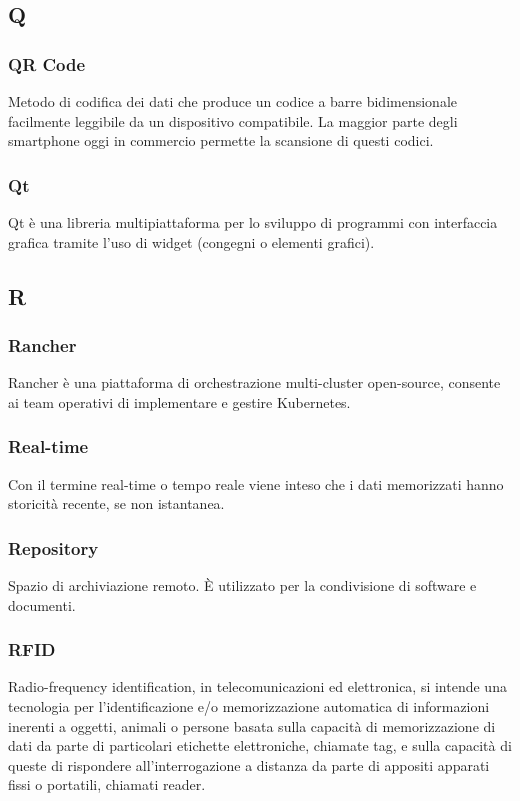 \subsection*{Q}
\subsubsection*{QR Code} Metodo di codifica dei dati che produce un codice a barre bidimensionale facilmente leggibile da un dispositivo compatibile. La maggior parte degli smartphone oggi in commercio permette la scansione di questi codici.
\subsubsection*{Qt} Qt è una libreria multipiattaforma per lo sviluppo di programmi con interfaccia grafica tramite l'uso di widget (congegni o elementi grafici).
\subsection*{R}
\subsubsection*{Rancher} Rancher è una piattaforma di orchestrazione multi-cluster open-source, consente ai team operativi di implementare e gestire Kubernetes.
\subsubsection*{Real-time} Con il termine real-time o tempo reale viene inteso che i dati memorizzati hanno storicità recente, se non istantanea.
\subsubsection*{Repository} Spazio di archiviazione remoto. È utilizzato per la condivisione di software e documenti.
\subsubsection*{RFID} Radio-frequency identification, in telecomunicazioni ed elettronica, si intende una tecnologia per l'identificazione e/o memorizzazione automatica di informazioni inerenti a oggetti, animali o persone basata sulla capacità di memorizzazione di dati da parte di particolari etichette elettroniche, chiamate tag, e sulla capacità di queste di rispondere all'interrogazione a distanza da parte di appositi apparati fissi o portatili, chiamati reader.
